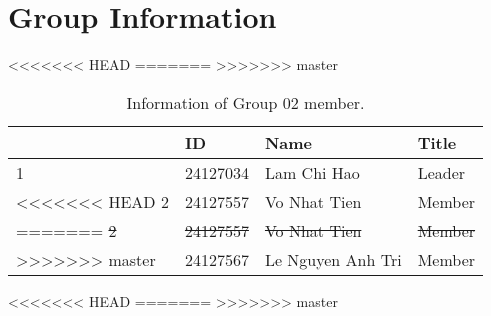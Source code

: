 \section{Group Information}
<<<<<<< HEAD
\label{sec:group-information}
=======
\label{sec:group-information-section}
>>>>>>> master

\renewcommand{\arraystretch}{1.5}
\begin{table}[ht]
    \centering
    \begin{tabular}{| m{1.75cm} | m{2cm} | m{5cm}| m{2.5cm} |} 
    \hline
    \textbf{} & \textbf{ID} & \textbf{Name} & \textbf{Title} \\ 
    \hline
    1 & 24127034 & Lam Chi Hao & Leader \\ 
    \hline
<<<<<<< HEAD
    2 & 24127557 & Vo Nhat Tien & Member \\ 
=======
    \sout{2} & \sout{24127557} & \sout{Vo Nhat Tien} & \sout{Member} \\ 
>>>>>>> master
    \hline
    3 & 24127567 & Le Nguyen Anh Tri & Member \\ 
    \hline
    \end{tabular}
    \caption{Information of Group 02 member.}
<<<<<<< HEAD
    \label{tab:group-information}
=======
    \label{tab:group-information-table}
>>>>>>> master
\end{table}